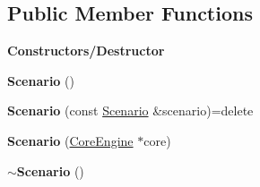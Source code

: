 \subsection*{Public Member Functions}
\begin{Indent}\textbf{ Constructors/\+Destructor}\par
\begin{DoxyCompactItemize}
\item 
\mbox{\label{classrev_1_1_scenario_a54d53cd00d8e3c04860d0abc9e38cab0}} 
{\bfseries Scenario} ()
\item 
\mbox{\label{classrev_1_1_scenario_a3240f649ca704ea704e278a9ee3a5ccf}} 
{\bfseries Scenario} (const \mbox{\hyperlink{classrev_1_1_scenario}{Scenario}} \&scenario)=delete
\item 
\mbox{\label{classrev_1_1_scenario_a2468dc29cb73dab9f23457e3e006bd70}} 
{\bfseries Scenario} (\mbox{\hyperlink{classrev_1_1_core_engine}{Core\+Engine}} $\ast$core)
\item 
\mbox{\label{classrev_1_1_scenario_a42fbd0841701f02ca28b57f01ed5a014}} 
{\bfseries $\sim$\+Scenario} ()
\end{DoxyCompactItemize}
\end{Indent}

